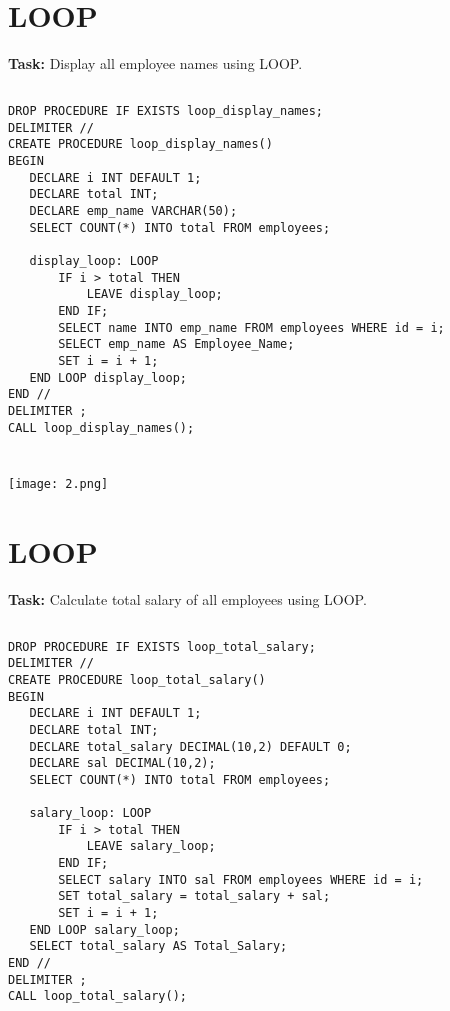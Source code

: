 \documentclass[12pt,a4paper]{article}
\begin{document}

\section{LOOP}
\textbf{Task:} Display all employee names using LOOP.

\subsection{}
\begin{lstlisting}
DROP PROCEDURE IF EXISTS loop_display_names;
DELIMITER //
CREATE PROCEDURE loop_display_names()
BEGIN
   DECLARE i INT DEFAULT 1;
   DECLARE total INT;
   DECLARE emp_name VARCHAR(50);
   SELECT COUNT(*) INTO total FROM employees;

   display_loop: LOOP
       IF i > total THEN
           LEAVE display_loop;
       END IF;
       SELECT name INTO emp_name FROM employees WHERE id = i;
       SELECT emp_name AS Employee_Name;
       SET i = i + 1;
   END LOOP display_loop;
END //
DELIMITER ;
CALL loop_display_names();


\end{lstlisting}

\subsubsection{}
\begin{center}
    \texttt{[image: 2.png]}
\end{center}


\section{LOOP}
\textbf{Task:} Calculate total salary of all employees using LOOP.

\subsection{}
\begin{lstlisting}
DROP PROCEDURE IF EXISTS loop_total_salary;
DELIMITER //
CREATE PROCEDURE loop_total_salary()
BEGIN
   DECLARE i INT DEFAULT 1;
   DECLARE total INT;
   DECLARE total_salary DECIMAL(10,2) DEFAULT 0;
   DECLARE sal DECIMAL(10,2);
   SELECT COUNT(*) INTO total FROM employees;

   salary_loop: LOOP
       IF i > total THEN
           LEAVE salary_loop;
       END IF;
       SELECT salary INTO sal FROM employees WHERE id = i;
       SET total_salary = total_salary + sal;
       SET i = i + 1;
   END LOOP salary_loop;
   SELECT total_salary AS Total_Salary;
END //
DELIMITER ;
CALL loop_total_salary();

\end{lstlisting}
\end{document}
